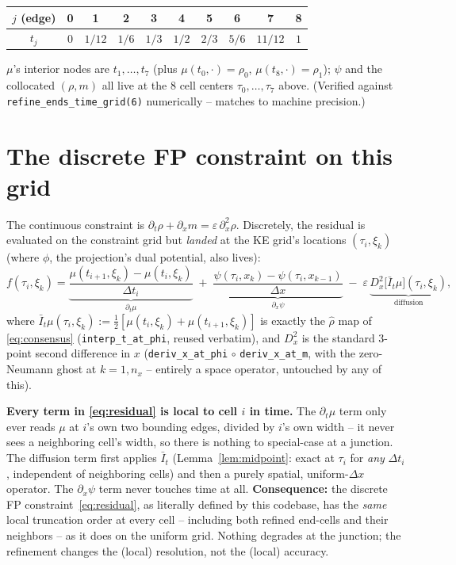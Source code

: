 \documentclass[11pt]{article}
\newcommand{\eps}{\varepsilon}
\newcommand{\dx}{\Delta x}
\newcommand{\code}[1]{\texttt{#1}}
\begin{document}
\begin{center}
\begin{tabular}{c|ccccccccc}
\toprule
$j$ (edge) & 0 & 1 & 2 & 3 & 4 & 5 & 6 & 7 & 8 \\
\midrule
$t_j$ & $0$ & $1/12$ & $1/6$ & $1/3$ & $1/2$ & $2/3$ & $5/6$ & $11/12$ & $1$ \\
\bottomrule
\end{tabular}
\end{center}

$\mu$'s interior nodes are $t_1,\ldots,t_7$ (plus $\mu(t_0,\cdot)=\rho_0$,
$\mu(t_8,\cdot)=\rho_1$); $\psi$ and the collocated $(\rho,m)$ all live at the $8$ cell
centers $\tau_0,\ldots,\tau_7$ above. (Verified against \code{refine\_ends\_time\_grid(6)}
numerically -- matches to machine precision.)

\section{The discrete FP constraint on this grid}
\label{sec:fp}

The continuous constraint is $\partial_t\rho + \partial_x m = \eps\,\partial_x^2\rho$.
Discretely, the residual is evaluated on the constraint grid but \emph{landed} at the
KE grid's locations $(\tau_i,\xi_k)$ (where $\phi$, the projection's dual potential,
also lives):
\begin{equation}
  \label{eq:residual}
  f(\tau_i,\xi_k) =
  \underbrace{\frac{\mu(t_{i+1},\xi_k)-\mu(t_i,\xi_k)}{\Delta t_i}}_{\partial_t\mu}
  \;+\;
  \underbrace{\frac{\psi(\tau_i,x_k)-\psi(\tau_i,x_{k-1})}{\dx}}_{\partial_x\psi}
  \;-\;
  \eps\,\underbrace{D_x^2\bigl[\bar I_t\mu\bigr](\tau_i,\xi_k)}_{\text{diffusion}},
\end{equation}
where $\bar I_t\mu(\tau_i,\xi_k) := \tfrac12[\mu(t_i,\xi_k)+\mu(t_{i+1},\xi_k)]$ is
exactly the $\hat\rho$ map of \eqref{eq:consensus} (\code{interp\_t\_at\_phi}, reused
verbatim), and $D_x^2$ is the standard $3$-point second difference in $x$
(\code{deriv\_x\_at\_phi} $\circ$ \code{deriv\_x\_at\_m}, with the zero-Neumann ghost at
$k=1,n_x$ -- entirely a space operator, untouched by any of this).

\medskip
\noindent\textbf{Every term in \eqref{eq:residual} is local to cell $i$ in time.} The
$\partial_t\mu$ term only ever reads $\mu$ at $i$'s own two bounding edges, divided by
$i$'s own width -- it never sees a neighboring cell's width, so there is nothing to
special-case at a junction. The diffusion term first applies $\bar I_t$
(Lemma~\ref{lem:midpoint}: exact at $\tau_i$ for \emph{any} $\Delta t_i$, independent of
neighboring cells) and then a purely spatial, uniform-$\dx$ operator. The
$\partial_x\psi$ term never touches time at all. \textbf{Consequence:} the discrete FP
constraint~\eqref{eq:residual}, as literally defined by this codebase, has the
\emph{same} local truncation order at every cell -- including both refined end-cells and
their neighbors -- as it does on the uniform grid. Nothing degrades at the junction; the
refinement changes the (local) resolution, not the (local) accuracy.
\end{document}
